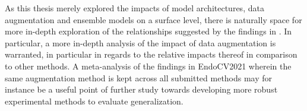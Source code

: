 As this thesis merely explored the impacts of model architectures, data augmentation and ensemble models on a surface level, there is naturally space for more in-depth exploration of the relationships suggested by the findings in . In particular, a more in-depth analysis of the impact of data augmentation is warranted, in particular in regards to the relative impacts thereof in comparison to other methods. A meta-analysis of the findings in EndoCV2021 wherein the same augmentation method is kept across all submitted methods may for instance be a useful point of further study towards developing more robust experimental methods to evaluate generalization. 






    
    

